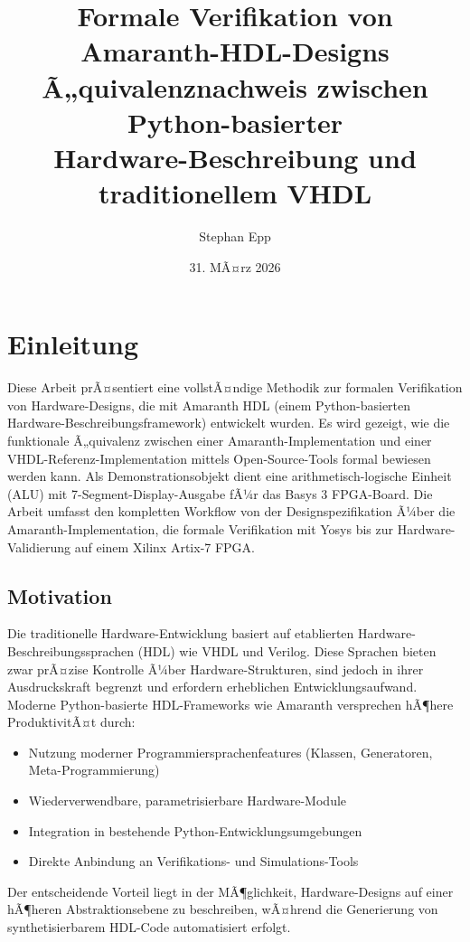 ﻿\documentclass[12pt,a4paper]{report}
\title{\textbf{Formale Verifikation von Amaranth-HDL-Designs} \\
    \large Ã„quivalenznachweis zwischen Python-basierter \\ Hardware-Beschreibung und traditionellem VHDL}
\author{Stephan Epp}
\date{31. MÃ¤rz 2026}
\begin{document}
\maketitle
\tableofcontents
\newpage

\chapter{Einleitung}

Diese Arbeit prÃ¤sentiert eine vollstÃ¤ndige Methodik zur formalen Verifikation von Hardware-Designs, die mit Amaranth HDL (einem Python-basierten Hardware-Beschreibungsframe\-work) entwickelt wurden. Es wird gezeigt, wie die funktionale Ã„quivalenz zwischen einer Amaranth-Implementation und einer VHDL-Referenz-Implementation mittels Open-Source-Tools formal bewiesen werden kann. Als Demonstrationsobjekt dient eine arithmetisch-logische Einheit (ALU) mit 7-Segment-Display-Ausgabe fÃ¼r das Basys 3 FPGA-Board. Die Arbeit umfasst den kompletten Workflow von der Designspezifikation Ã¼ber die Amaranth-Implementation, die formale Verifikation mit Yosys bis zur Hardware-Validierung auf einem Xilinx Artix-7 FPGA.

\section{Motivation}

Die traditionelle Hardware-Entwicklung basiert auf etablierten Hardware-Beschreibungs\-sprachen (HDL) wie VHDL und Verilog. Diese Sprachen bieten zwar prÃ¤zise Kontrolle Ã¼ber Hardware-Strukturen, sind jedoch in ihrer Ausdruckskraft begrenzt und erfordern erheblichen Entwicklungsaufwand. Moderne Python-basierte HDL-Frameworks wie Amaranth \cite{amaranth2024} versprechen hÃ¶here ProduktivitÃ¤t durch:

\begin{itemize}
    \item Nutzung moderner Programmiersprachenfeatures (Klassen, Generatoren, Meta-Programmierung)
    \item Wiederverwendbare, parametrisierbare Hardware-Module
    \item Integration in bestehende Python-Entwicklungsumgebungen
    \item Direkte Anbindung an Verifikations- und Simulations-Tools
\end{itemize}

Der entscheidende Vorteil liegt in der MÃ¶glichkeit, Hardware-Designs auf einer hÃ¶heren Abstraktionsebene zu beschreiben, wÃ¤hrend die Generierung von synthetisierbarem HDL-Code automatisiert erfolgt.
\end{document}
